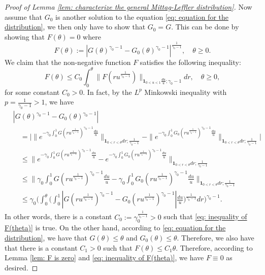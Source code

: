 \documentclass[12pt, a4paper]{amsart}
\theoremstyle{definition}
\numberwithin{equation}{section}
\begin{document}
\begin{proof}[Proof of Lemma \ref{lem: characterize the general Mittag-Leffler distribution}]
	Now assume that $G_0$ is another solution to the equation \eqref{eq: equation for the distribution}, we then only have to show that $G_0 = G$.
	This can be done by showing that $F(\theta) = 0$ where
\begin{equation}
	F(\theta) 
	:= |G(\theta)^{\gamma_0 - 1} - G_0(\theta)^{\gamma_0 - 1}|^{\frac{1}{\gamma_0 - 1}},
	\quad \theta \geq 0.
\end{equation}
	We claim that the non-negative function $F$ satisfies
	the following inequality:
\begin{equation}\label{eq: inequality of F(theta)}
	F(\theta)
	\leq C_0 \int_0^\theta \|  F(ru^{\frac{1}{\gamma_0 - 1}})\|_{\mathbf 1_{0<u<1}\frac{du}{u}; \gamma_0 - 1} dr, \quad \theta \geq 0,
\end{equation}
	for some constant $C_0 > 0$.
	In fact, by the $L^p$ Minkowski inequality with $p = \frac{1}{\gamma_0 - 1} > 1$, we have
\begin{equation}\begin{split}
	&|G(\theta)^{\gamma_0 - 1} - G_0(\theta)^{\gamma_0 - 1}|
	\\&\quad = \Big| \|e^{-\gamma_0\int_0^1 G(ru^{\frac{1}{\gamma_0 - 1}})^{\gamma_0 - 1} \frac{du}{u}} \|_{\mathbf 1_{0<r<\theta}dr;\frac{1}{\gamma_0 - 1}} - \|e^{-\gamma_0\int_0^1 G_0(ru^{\frac{1}{\gamma_0 - 1}})^{\gamma_0 - 1} \frac{du}{u}} \|_{\mathbf 1_{0<r<\theta}dr;\frac{1}{\gamma_0 - 1}} \Big|
	\\ & \quad \leq \| e^{-\gamma_0\int_0^1 G(ru^{\frac{1}{\gamma_0 - 1}})^{\gamma_0 - 1} \frac{du}{u}} - e^{-\gamma_0\int_0^1 G_0(ru^{\frac{1}{\gamma_0 - 1}})^{\gamma_0 - 1} \frac{du}{u}} \|_{\mathbf 1_{0<r<\theta}dr;\frac{1}{\gamma_0 - 1}}
	\\ & \quad \leq \Big\| \gamma_0\int_0^1 G(ru^{\frac{1}{\gamma_0 - 1}})^{\gamma_0 - 1} \frac{du}{u} - \gamma_0\int_0^1 G_0(ru^{\frac{1}{\gamma_0 - 1}})^{\gamma_0 - 1} \frac{du}{u} \Big\|_{\mathbf 1_{0<r<\theta}dr;\frac{1}{\gamma_0 - 1}}
	\\ & \quad \leq \gamma_0 \Bigg( \int_0^\theta \Big( \int_0^1 |G(ru^{\frac{1}{\gamma_0 - 1}})^{\gamma_0 - 1} - G_0(ru^{\frac{1}{\gamma_0 - 1}})^{\gamma_0 - 1}| \frac{du}{u} \Big)^{\frac{1}{\gamma_0 - 1}} dr \Bigg)^{\gamma_0 - 1}.
\end{split}\end{equation}
	In other words, there is a constant $C_0:= \gamma_0^{\frac{1}{\gamma_0 - 1}}>0$ such that \eqref{eq: inequality of F(theta)} is true.
	On the other hand, according to \eqref{eq: equation for the distribution}, we have that $G(\theta) \leq \theta$ and $G_0(\theta) \leq \theta$.
	Therefore, we also have that there is a constant $C_1 > 0$ such that $F(\theta) \leq C_1 \theta$.
	Therefore, according to Lemma \ref{lem: F is zero} and \eqref{eq: inequality of F(theta)}, we have $F \equiv 0$ as desired.
\end{proof}
\end{document}
